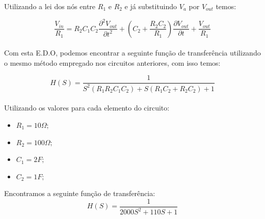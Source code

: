 \documentclass[a4paper, 12pt]{article}
\begin{document}
			Utilizando a lei dos nós entre $R_{1}$ e $R_{2}$ e já substituindo $V_{a}$ por $V_{out}$ temos:
			
			\[
			\frac{V_{in}}{R_{1}} = R_{2}C_{1}C_{2}\frac{\partial^{2} V_{out}}{\partial t^{2}} + \left(C_{2} + \frac{R_{2}C_{2}}{R_{1}}\right)\frac{\partial V_{out}}{\partial t} +  \frac{V_{out}}{R_{1}}
			\] 	\\			
			
			Com esta E.D.O, podemos encontrar a seguinte função de transferência utilizando o mesmo método empregado nos circuitos anteriores, com isso temos:
			
			\[
			H(S) = \frac{1}{S^{2}\left(R_{1}R_{2}C_{1}C_{2}\right) + S\left(R_{1}C_{2} + R_{2}C_{2}\right) + 1}
			\] 	\\					
			
			Utilizando os valores para cada elemento do circuito:
			\begin{itemize}
				\item $R_{1} = 10\Omega;$
				\item $R_{2} = 100\Omega;$
				\item $C_{1} = 2F;$
				\item $C_{2} = 1F;$
			\end{itemize}				

			Encontramos a seguinte função de transferência:
			\[
			H(S) = \frac{1}{2000S^{2} + 110S + 1}
			\] 	\\				
			
\end{document}
